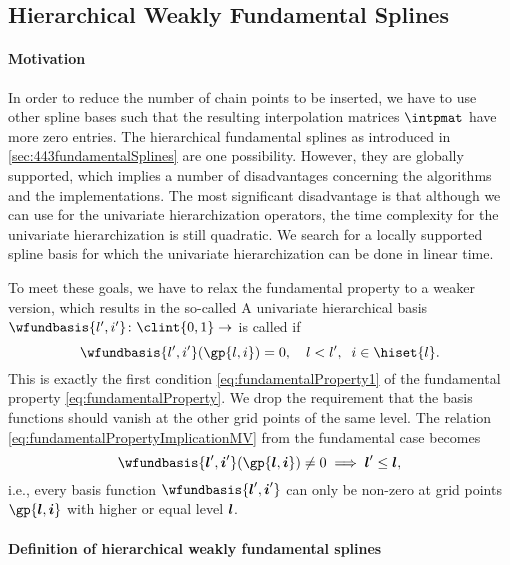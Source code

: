 \subsection{Hierarchical Weakly Fundamental Splines}
\label{sec:454wfs}

\paragraph{Motivation}

In order to reduce the number of chain points to be inserted,
we have to use other spline bases such that
the resulting interpolation matrices $\intpmat$ have more zero entries.
The hierarchical fundamental splines
as introduced in \cref{sec:443fundamentalSplines} are one possibility.
However, they are globally supported, which implies a number
of disadvantages concerning the algorithms and the implementations.
The most significant disadvantage is that although
we can use \bfs for the univariate hierarchization operators,
the time complexity for the univariate hierarchization is still quadratic.
We search for a locally supported spline basis for which
the univariate hierarchization can be done in linear time.

To meet these goals, we have to relax the fundamental property
to a weaker version, which results in the so-called
A univariate hierarchical basis
$\wfundbasis{l',i'}\colon \clint{0, 1} \to \real$
is called  if
\begin{equation}
  \label{eq:weaklyFundamentalProperty}
  \wfundbasis{l',i'}(\gp{l,i}) = 0,\quad
  l < l',\;\;
  i \in \hiset{l}.
\end{equation}
This is exactly the first condition \eqref{eq:fundamentalProperty1}
of the fundamental property \eqref{eq:fundamentalProperty}.
We drop the requirement that the basis functions
should vanish at the other grid points of the same level.
The relation \eqref{eq:fundamentalPropertyImplicationMV} from the
fundamental case becomes
\begin{equation}
  \label{eq:weaklyFundamentalPropertyImplicationMV}
  \wfundbasis{\*l',\*i'}(\gp{\*l,\*i})
  \not= 0
  \implies
  \*l' \le \*l,
\end{equation}
i.e., every basis function $\wfundbasis{\*l',\*i'}$
can only be non-zero at grid points $\gp{\*l,\*i}$ with
higher or equal level ${\boldsymbol{l}}$.

\paragraph{Definition of hierarchical weakly fundamental splines}


